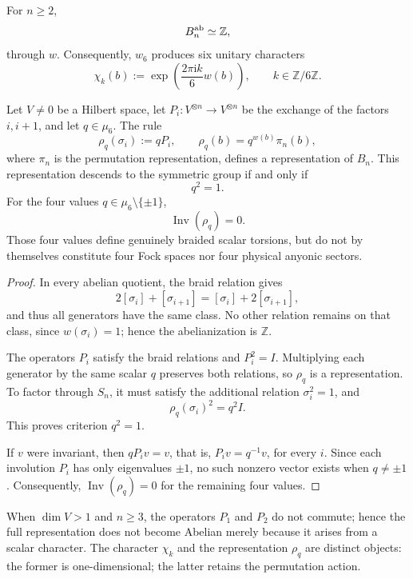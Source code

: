 \begin{theorem}
\label{thm:trenzas-caracteres-z6}
For \(n\geq2\),
\[
 B_n^{\rm ab}\simeq\mathbb Z,
\]
through \(w\). Consequently, \(w_6\) produces six unitary characters
\[
 \chi_k(b)
 :=\exp\!\left(\frac{2\pi\mathrm i k}{6}w(b)\right),
 \qquad k\in\mathbb Z/6\mathbb Z.
\]

Let \(V\ne0\) be a Hilbert space, let
\(P_i:V^{\otimes n}\to V^{\otimes n}\) be the exchange of the factors
\(i,i+1\), and let \(q\in\mu_6\). The rule
\[
 \rho_q(\sigma_i):=qP_i,
 \qquad
 \rho_q(b)=q^{w(b)}\pi_n(b),
\]
where \(\pi_n\) is the permutation representation, defines a
representation of \(B_n\). This representation descends to the symmetric group
if and only if
\[
 q^2=1.
\]
For the four values \(q\in\mu_6\setminus\{\pm1\}\),
\[
 \operatorname{Inv}(\rho_q)=0.
\]
Those four values define genuinely braided scalar torsions, but
do not by themselves constitute four Fock spaces nor four physical
anyonic sectors.
\end{theorem}

\begin{proof}
In every abelian quotient, the braid relation gives
\[
 2[\sigma_i]+[\sigma_{i+1}]
 =[\sigma_i]+2[\sigma_{i+1}],
\]
and thus all generators have the same class. No other relation remains on
that class, since \(w(\sigma_i)=1\); hence the abelianization is
\(\mathbb Z\).

The operators \(P_i\) satisfy the braid relations and
\(P_i^2=I\). Multiplying each generator by the same scalar \(q\) preserves
both relations, so \(\rho_q\) is a representation. To
factor through \(S_n\), it must satisfy the additional relation
\(\sigma_i^2=1\), and
\[
 \rho_q(\sigma_i)^2=q^2I.
\]
This proves criterion \(q^2=1\).

If \(v\) were invariant, then
\(qP_i v=v\), that is, \(P_i v=q^{-1}v\), for every \(i\). Since each
involution \(P_i\) has only eigenvalues \(\pm1\), no such nonzero vector
exists when \(q\ne\pm1\). Consequently,
\(\operatorname{Inv}(\rho_q)=0\) for the remaining four values.
\end{proof}

When \(\dim V>1\) and \(n\geq3\), the operators \(P_1\) and \(P_2\) do not
commute; hence the full representation does not become Abelian merely because
it arises from a scalar character. The character \(\chi_k\) and the representation
\(\rho_q\) are distinct objects: the former is one-dimensional; the latter
retains the permutation action.

